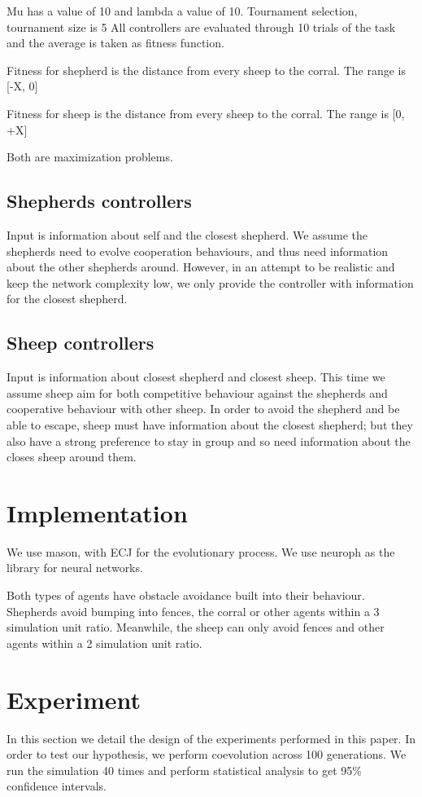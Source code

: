 \documentclass[conference]{IEEEtran}
\begin{document}
Mu has a value of 10 and lambda a value of 10. 
Tournament selection, tournament size is 5
All controllers are evaluated through 10 trials of the task and the average is taken as fitness function. 

Fitness for shepherd is the distance from every sheep to the corral. The range is [-X, 0]

Fitness for sheep is the distance from every sheep to the corral. The range is [0, +X]

Both are maximization problems.


\subsection{Shepherds controllers}
Input is information about self and the closest shepherd. We assume the shepherds need to evolve cooperation behaviours, and thus need information about the other shepherds around. However, in an attempt to be realistic and keep the network complexity low, we only provide the controller with information for the closest shepherd. 

\subsection{Sheep controllers}
Input is information about closest shepherd and closest sheep. This time we assume sheep aim for both competitive behaviour against the shepherds and cooperative behaviour with other sheep. In order to avoid the shepherd and be able to escape, sheep must have information about the closest shepherd; but they also have a strong preference to stay in group and so need information about the closes sheep around them. 

\section{Implementation}
We use mason, with ECJ for the evolutionary process. We use neuroph as the library for neural networks. 

Both types of agents have obstacle avoidance built into their behaviour. Shepherds avoid bumping into fences, the corral or other agents within a 3 simulation unit ratio. Meanwhile, the sheep can only avoid fences and other agents within a 2 simulation unit ratio. 

\section{Experiment}
\label{sec:experiment}
In this section we detail the design of the experiments performed in this paper. In order to test our hypothesis, we perform coevolution across 100 generations. We run the simulation 40 times and perform statistical analysis to get 95\% confidence intervals.
\end{document}
